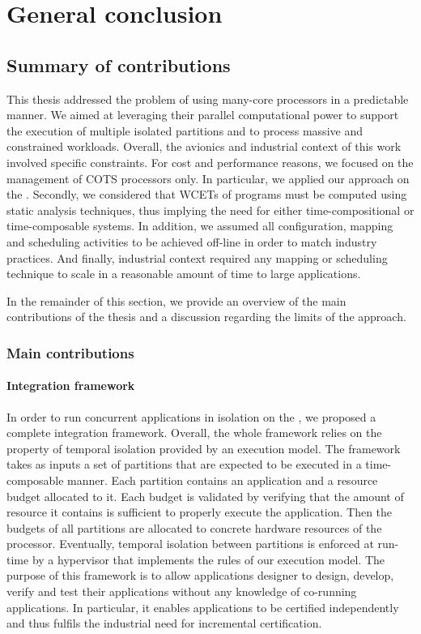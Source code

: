 \documentclass[main.tex]{subfiles}
\begin{document}
\chapter{General conclusion}
\thispagestyle{chapstyle}
\label{chap_conclu}
\minitoc

\section{Summary of contributions}
This thesis addressed the problem of using many-core processors in a predictable manner. We aimed at leveraging their parallel computational power to support the execution of multiple isolated partitions and to process massive and constrained workloads. Overall, the avionics and industrial context of this work involved specific constraints. For cost and performance reasons, we focused on the management of COTS processors only. In particular, we applied our approach on the \mppalong. Secondly, we considered that WCETs of programs must be computed using static analysis techniques, thus implying the need for either time-compositional or time-composable systems. In addition, we assumed all configuration, mapping and scheduling activities to be achieved off-line in order to match industry practices. And finally, industrial context required any mapping or scheduling technique to scale in a reasonable amount of time to large applications.

In the remainder of this section, we provide an overview of the main contributions of the thesis and a discussion regarding the limits of the approach.

\subsection{Main contributions}
\subsubsection{Integration framework}
In order to run concurrent applications in isolation on the \mppalong, we proposed a complete integration framework. Overall, the whole framework relies on the property of temporal isolation provided by an execution model. The framework takes as inputs a set of partitions that are expected to be executed in a time-composable manner. Each partition contains an application and a resource budget allocated to it. Each budget is validated by verifying that the amount of resource it contains is sufficient to properly execute the application. Then the budgets of all partitions are allocated to concrete hardware resources of the processor. Eventually, temporal isolation between partitions is enforced at run-time by a hypervisor that implements the rules of our execution model. The purpose of this framework is to allow applications designer to design, develop, verify and test their applications without any knowledge of co-running applications. In particular, it enables applications to be certified independently and thus fulfils the industrial need for incremental certification. 
\end{document}
